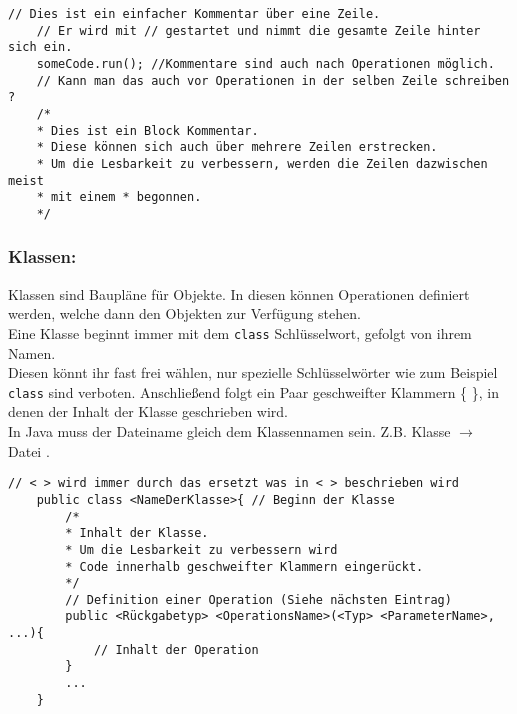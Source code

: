 \begin{lstlisting}[title=\textbf{Kommentar Beispiel}]
	// Dies ist ein einfacher Kommentar über eine Zeile.
	// Er wird mit // gestartet und nimmt die gesamte Zeile hinter sich ein.
	someCode.run(); //Kommentare sind auch nach Operationen möglich.
	// Kann man das auch vor Operationen in der selben Zeile schreiben ?
	/*
	* Dies ist ein Block Kommentar.
	* Diese können sich auch über mehrere Zeilen erstrecken.
	* Um die Lesbarkeit zu verbessern, werden die Zeilen dazwischen meist
	* mit einem * begonnen.
	*/
\end{lstlisting}
\lstset{
	basicstyle=\small
}
\begin{Infobox}

	\subsubsection*{Klassen:}
	Klassen sind Baupläne für Objekte.
	In diesen können Operationen definiert werden, welche dann den Objekten zur Verfügung stehen.\\
	Eine Klasse beginnt immer mit dem \lstinline{class} Schlüsselwort, gefolgt von ihrem Namen.\\
	Diesen könnt ihr fast frei wählen, nur spezielle Schlüsselwörter wie zum Beispiel \lstinline{class} sind verboten.
	Anschließend folgt ein Paar geschweifter Klammern \{ \}, in denen der Inhalt der Klasse geschrieben wird.\\
	In Java muss der Dateiname gleich dem Klassennamen sein. Z.B. Klasse  $\rightarrow$ Datei .
\end{Infobox}
\begin{lstlisting}[title=\textbf{Klassen Syntax}]
	// < > wird immer durch das ersetzt was in < > beschrieben wird
	public class <NameDerKlasse>{ // Beginn der Klasse
		/*
		* Inhalt der Klasse.
		* Um die Lesbarkeit zu verbessern wird
		* Code innerhalb geschweifter Klammern eingerückt.
		*/
		// Definition einer Operation (Siehe nächsten Eintrag)
		public <Rückgabetyp> <OperationsName>(<Typ> <ParameterName>, ...){
			// Inhalt der Operation
		}
		...
	}
\end{lstlisting}

\newpage

